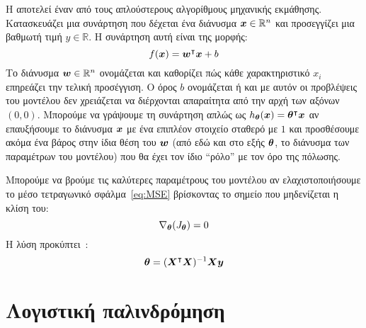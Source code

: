Η  αποτελεί έναν από τους απλούστερους αλγορίθμους μηχανικής εκμάθησης.
Κατασκευάζει μια συνάρτηση που δέχεται ένα διάνυσμα $\vx \in \mathbb{R}^n$ και προσεγγίζει μια βαθμωτή τιμή $y \in \mathbb{R}$.
Η συνάρτηση αυτή είναι της μορφής:
\begin{equation}
    \label{eq:linear-regression}
    f(\vx) = \vw^\intercal \vx + b
\end{equation}
Το διάνυσμα $\vw \in \mathbb{R}^n$ ονομάζεται  και καθορίζει πώς κάθε χαρακτηριστικό $x_i$ επηρεάζει την τελική προσέγγιση.
Ο όρος $b$ ονομάζεται  ή  και με αυτόν οι προβλέψεις του μοντέλου δεν χρειάζεται να διέρχονται απαραίτητα από την αρχή των αξόνων $(0, 0)$.
Μπορούμε να γράψουμε τη συνάρτηση απλώς ως $\hth(\vx) = \vth^\intercal \vx$ αν επαυξήσουμε το διάνυσμα $\vx$ με ένα επιπλέον στοιχείο σταθερό με $1$ και προσθέσουμε ακόμα ένα βάρος στην ίδια θέση του $\vw$
(από εδώ και στο εξής $\vth$, το διάνυσμα των παραμέτρων του μοντέλου)
που θα έχει τον ίδιο \enquote{ρόλο} με τον όρο της πόλωσης.

Μπορούμε να βρούμε τις καλύτερες παραμέτρους του μοντέλου αν ελαχιστοποιήσουμε το μέσο τετραγωνικό σφάλμα~\ref{eq:MSE} βρίσκοντας το σημείο που μηδενίζεται η κλίση του:
\begin{equation}
    \nabla_{\vth}(J_{\vth}) = 0
\end{equation}
Η λύση προκύπτει~\cite{goodfellow}:
\begin{equation}
    \vth = (\vX^\intercal \vX)^{-1} \vX \vec{y}
\end{equation}

\section{Λογιστική παλινδρόμηση}\label{sec:logistic-regression}

